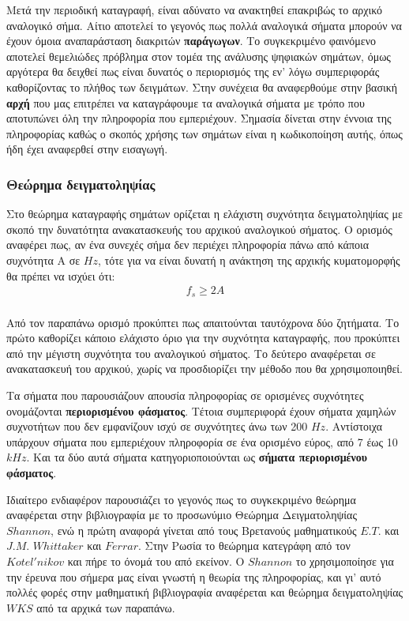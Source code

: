 \documentclass[breaklines=true, 12pt]{article}
\begin{document}
Μετά την περιοδική καταγραφή, είναι αδύνατο να ανακτηθεί επακριβώς το αρχικό
αναλογικό σήμα. Αίτιο αποτελεί το γεγονός πως πολλά αναλογικά σήματα μπορούν
να έχουν όμοια αναπαράσταση διακριτών \textbf{παράγωγων}. Το συγκεκριμένο
φαινόμενο αποτελεί θεμελιώδες πρόβλημα στον τομέα της ανάλυσης ψηφιακών
σημάτων, όμως αργότερα θα δειχθεί πως είναι δυνατός ο περιορισμός της εν' λόγω
συμπεριφοράς καθορίζοντας το πλήθος των δειγμάτων. Στην συνέχεια θα αναφερθούμε
στην βασική \textbf{αρχή} που μας επιτρέπει να καταγράφουμε τα αναλογικά σήματα με
τρόπο που αποτυπώνει όλη την πληροφορία που εμπεριέχουν. Σημασία δίνεται στην
έννοια της πληροφορίας καθώς ο σκοπός χρήσης των σημάτων είναι η κωδικοποίηση
αυτής, όπως ήδη έχει αναφερθεί στην εισαγωγή.
\subsubsection{Θεώρημα δειγματοληψίας}
\label{sec:orgc989f9b}
Στο θεώρημα καταγραφής σημάτων ορίζεται η ελάχιστη συχνότητα δειγματοληψίας με
σκοπό την δυνατότητα ανακατασκευής του αρχικού αναλογικού σήματος. Ο ορισμός αναφέρει
πως, αν ένα συνεχές σήμα δεν περιέχει πληροφορία πάνω από κάποια συχνότητα Α σε
\(Hz\), τότε για να είναι δυνατή η ανάκτηση της αρχικής κυματομορφής θα πρέπει να
ισχύει ότι:
\begin{equation}
\begin{align}
f_{s} \geq 2A \\
\end{align}
\end{equation}

Από τον παραπάνω ορισμό προκύπτει πως απαιτούνται ταυτόχρονα δύο ζητήματα. Το
πρώτο καθορίζει κάποιο ελάχιστο όριο για την συχνότητα καταγραφής, που προκύπτει
από την μέγιστη συχνότητα του αναλογικού σήματος. Το δεύτερο αναφέρεται σε
ανακατασκευή του αρχικού, χωρίς να προσδιορίζει την μέθοδο που θα χρησιμοποιηθεί.

Τα σήματα που παρουσιάζουν απουσία πληροφορίας σε ορισμένες συχνότητες ονομάζονται
\textbf{περιορισμένου φάσματος}. Τέτοια συμπεριφορά έχουν σήματα χαμηλών συχνοτήτων που δεν
εμφανίζουν ισχύ σε συχνότητες άνω των 200 \(Hz\). Αντίστοιχα υπάρχουν σήματα που
εμπεριέχουν πληροφορία σε ένα ορισμένο εύρος, από 7 έως 10 \(kHz\). Και τα δύο αυτά
σήματα κατηγοριοποιούνται ως \textbf{σήματα περιορισμένου φάσματος}.

Ιδιαίτερο ενδιαφέρον παρουσιάζει το γεγονός πως το συγκεκριμένο θεώρημα αναφέρεται
στην βιβλιογραφία με το προσωνύμιο Θεώρημα Δειγματοληψίας \(Shannon\), ενώ
η πρώτη αναφορά γίνεται από τους Βρετανούς μαθηματικούς \(E.T.\) και \(J.M.\)
\(Whittaker\) και \(Ferrar\). Στην Ρωσία το θεώρημα κατεγράφη από τον
\(Kotel'nikov\) και πήρε το όνομά του από εκείνον. Ο \(Shannon\)
το χρησιμοποίησε για την έρευνα που σήμερα μας είναι γνωστή η θεωρία της
πληροφορίας, και γι' αυτό πολλές φορές στην μαθηματική βιβλιογραφία
αναφέρεται και θεώρημα δειγματοληψίας \(WKS\) από τα αρχικά των παραπάνω.
\end{document}
